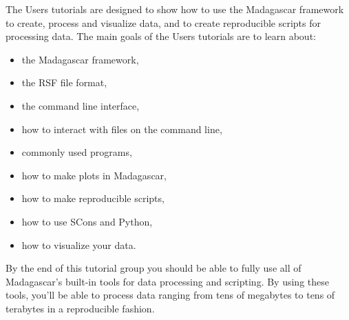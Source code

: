 The Users tutorials are designed to show how to use the Madagascar framework to create, process and visualize data, and to create reproducible scripts for processing data.  The main goals of the Users tutorials are to learn about:
\begin{itemize}
    \item the Madagascar framework,
    \item the RSF file format,
    \item the command line interface,
    \item how to interact with files on the command line,
    \item commonly used programs,
    \item how to make plots in Madagascar,
    \item how to make reproducible scripts,
    \item how to use SCons and Python,
    \item how to visualize your data.
\end{itemize}
By the end of this tutorial group you should be able to fully use all of Madagascar's built-in tools for data processing and scripting.  By using these tools, you'll be able to process data ranging from tens of megabytes to tens of terabytes in a reproducible fashion.  
